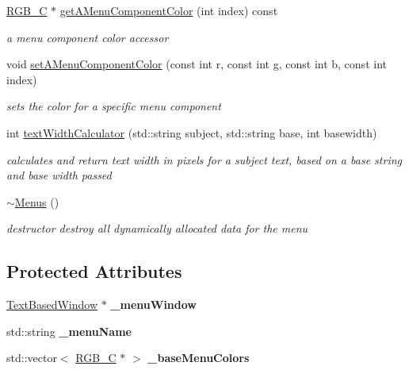 \begin{DoxyCompactItemize}
\hypertarget{class_menus_a851624da61a43ff41381915e77d52542}{}\label{class_menus_a851624da61a43ff41381915e77d52542} 
\hyperlink{struct_r_g_b___c}{R\+G\+B\+\_\+C} $\ast$ \hyperlink{class_menus_a851624da61a43ff41381915e77d52542}{get\+A\+Menu\+Component\+Color} (int index) const
\begin{DoxyCompactList}\small\item\em a menu component color accessor \end{DoxyCompactList}\item 
\hypertarget{class_menus_adb7cbb1b3a40a33c934e7a59e561c822}{}\label{class_menus_adb7cbb1b3a40a33c934e7a59e561c822} 
void \hyperlink{class_menus_adb7cbb1b3a40a33c934e7a59e561c822}{set\+A\+Menu\+Component\+Color} (const int r, const int g, const int b, const int index)
\begin{DoxyCompactList}\small\item\em sets the color for a specific menu component \end{DoxyCompactList}\item 
\hypertarget{class_menus_a2e47a0621fa3ab517b05582863b40c6c}{}\label{class_menus_a2e47a0621fa3ab517b05582863b40c6c} 
int \hyperlink{class_menus_a2e47a0621fa3ab517b05582863b40c6c}{text\+Width\+Calculator} (std\+::string subject, std\+::string base, int basewidth)
\begin{DoxyCompactList}\small\item\em calculates and return text width in pixels for a subject text, based on a base string and base width passed \end{DoxyCompactList}\item 
\hypertarget{class_menus_aa6cea19ab085cb4d3b4c81220884a42d}{}\label{class_menus_aa6cea19ab085cb4d3b4c81220884a42d} 
\hyperlink{class_menus_aa6cea19ab085cb4d3b4c81220884a42d}{$\sim$\+Menus} ()
\begin{DoxyCompactList}\small\item\em destructor destroy all dynamically allocated data for the menu \end{DoxyCompactList}\end{DoxyCompactItemize}
\subsection*{Protected Attributes}
\begin{DoxyCompactItemize}
\item 
\hypertarget{class_menus_abe64451749421afbf7f668b5d28867eb}{}\label{class_menus_abe64451749421afbf7f668b5d28867eb} 
\hyperlink{class_text_based_window}{Text\+Based\+Window} $\ast$ {\bfseries \+\_\+menu\+Window}
\item 
\hypertarget{class_menus_ae654d6aa975ddc02613304b4bd4e32c2}{}\label{class_menus_ae654d6aa975ddc02613304b4bd4e32c2} 
std\+::string {\bfseries \+\_\+menu\+Name}
\item 
\hypertarget{class_menus_a8548fb85b7f3551d1f30007e85b06e97}{}\label{class_menus_a8548fb85b7f3551d1f30007e85b06e97} 
std\+::vector$<$ \hyperlink{struct_r_g_b___c}{R\+G\+B\+\_\+C} $\ast$ $>$ {\bfseries \+\_\+base\+Menu\+Colors}
\end{DoxyCompactItemize}


